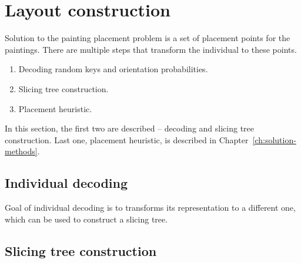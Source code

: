 \section{Layout construction}\label{sec:layout-construction}

Solution to the painting placement problem is a set of placement points for the paintings.
There are multiple steps that transform the individual to these points.

\begin{enumerate}
    \item Decoding random keys and orientation probabilities.
    \item Slicing tree construction.
    \item Placement heuristic.
\end{enumerate}

In this section, the first two are described – decoding and slicing tree construction.
Last one, placement heuristic, is described in Chapter~\ref{ch:solution-methods}.

\subsection{Individual decoding}\label{subsec:individual-decoding}
Goal of individual decoding is to transforms its representation to a different one,
which can be used to construct a slicing tree.

\subsection{Slicing tree construction}\label{subsec:slicing-tree-construction}

